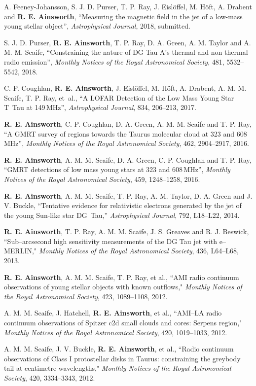 \begin{cvpubs}
  \cvpub
    {
      \begin{cvetar}
      \item{A. Feeney-Johansson, S. J. D. Purser, T. P. Ray,  J. Eisl{\"o}ffel, M. H{\"o}ft, A. Drabent and \textbf{R. E. Ainsworth}, ``Measuring the magnetic field in the jet of a low-mass young stellar object'', \textit{Astrophysical Journal}, 2018, submitted.}
       \item {S. J. D. Purser, \textbf{R. E. Ainsworth}, T. P. Ray, D. A. Green, A. M. Taylor and A. M. M. Scaife, ``Constraining the nature of DG Tau A's thermal and non-thermal radio emission'', \textit{Monthly Notices of the Royal Astronomical Society}, 481, 5532--5542, 2018.}
        \item {C. P. Coughlan, \textbf{R. E. Ainsworth}, J. Eisl{\"o}ffel, M. H{\"o}ft, A. Drabent, A. M. M. Scaife, T. P. Ray, et~al., ``A LOFAR Detection of the Low Mass Young Star T~Tau at 149\,MHz'', \textit{Astrophysical Journal}, 834, 206--213, 2017.}
        \item {\textbf{R. E. Ainsworth}, C. P. Coughlan, D. A. Green, A. M. M. Scaife and T. P. Ray, ``A GMRT survey of regions towards the Taurus molecular cloud at 323 and 608\,MHz'', \textit{Monthly Notices of the Royal Astronomical Society}, 462, 2904--2917, 2016.}
\item {\textbf{R. E. Ainsworth}, A. M. M. Scaife, D. A. Green, C. P. Coughlan and T. P. Ray, ``GMRT detections of low mass young stars at 323 and 608\,MHz'', \textit{Monthly Notices of the Royal Astronomical Society}, 459, 1248--1258, 2016.}
\item {\textbf{R. E. Ainsworth}, A. M. M. Scaife, T. P. Ray, A. M. Taylor, D. A. Green and J. V. Buckle, ``Tentative evidence for relativistic electrons generated by the jet of the young Sun-like star DG~Tau,'' \textit{Astrophysical Journal}, 792, L18--L22, 2014.}
\item {\textbf{R. E. Ainsworth}, T. P. Ray, A. M. M. Scaife, J. S. Greaves and R. J. Beswick, ``Sub--arcsecond high sensitivity measurements of the DG Tau jet with e--MERLIN," \textit{Monthly Notices of the Royal Astronomical Society}, 436, L64--L68, 2013.}
\item {\textbf{R. E. Ainsworth}, A. M. M. Scaife, T. P. Ray, et al., ``AMI radio continuum observations of young stellar objects with known outflows," \textit{Monthly Notices of the Royal Astronomical Society}, 423, 1089--1108, 2012.}
\item {A. M. M. Scaife, J. Hatchell, \textbf{R. E. Ainsworth}, et al., ``AMI--LA radio continuum observations of Spitzer c2d small clouds and cores: Serpens region," \textit{Monthly Notices of the Royal Astronomical Society}, 420, 1019--1033, 2012.}
\item {A. M. M. Scaife, J. V. Buckle, \textbf{R. E. Ainsworth}, et al., ``Radio continuum observations of Class I protostellar disks in Taurus: constraining the greybody tail at centimetre wavelengths," \textit{Monthly Notices of the Royal Astronomical Society}, 420, 3334--3343, 2012.}
      \end{cvetar}
    }
\end{cvpubs}

